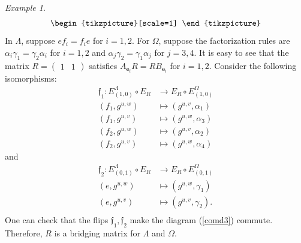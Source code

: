 \documentclass[12pt]{amsart}
\theoremstyle{definition}
\theoremstyle{remark}
\newtheorem{example}[thm]{Example}
\begin{document}
\begin{example}
\[\begin{tikzpicture}[scale=1]
\end{tikzpicture}
\]
In $\Lambda$, suppose $ef_i=f_i e$ for $i=1,2$. For $\Omega$, suppose the factorization rules are $\alpha_i\gamma_1=\gamma_2\alpha_i$ for $i=1,2$ and $\alpha_j\gamma_2=\gamma_1\alpha_j$ for $j=3,4$. It is easy to see that the matrix $R=\begin{pmatrix}
1 & 1
\end{pmatrix}$ satisfies $A_{\mathbf{e}_i}R=RB_{\mathbf{e}_i}$ for $i=1,2$. Consider the following isomorphisms:
\begin{align*}
    \mathfrak{f}_1:E_{(1,0)}^\Lambda\circ E_R &\longrightarrow E_R\circ E_{(1,0)}^\Omega\\
    (f_1,g^{u,w})&\longmapsto (g^{u,v},\alpha_1)\\
    (f_1,g^{u,v})&\longmapsto (g^{u,w},\alpha_3)\\
    (f_2,g^{u,w})&\longmapsto (g^{u,v},\alpha_2)\\
    (f_2,g^{u,v})&\longmapsto (g^{u,w},\alpha_4)
\end{align*}
and
\begin{align*}
    \mathfrak{f}_2:E_{(0,1)}^\Lambda\circ E_R &\longrightarrow E_R\circ E_{(0,1)}^\Omega\\
    (e,g^{u,w})&\longmapsto (g^{u,w},\gamma_1)\\
    (e,g^{u,v})&\longmapsto (g^{u,v},\gamma_2).\\
\end{align*}
One can check that the flips $\mathfrak{f}_1,\mathfrak{f}_2$ make the diagram (\ref{comd3}) commute. Therefore, $R$ is a bridging matrix for $\Lambda$ and $\Omega$. 
\end{example}
\end{document}
